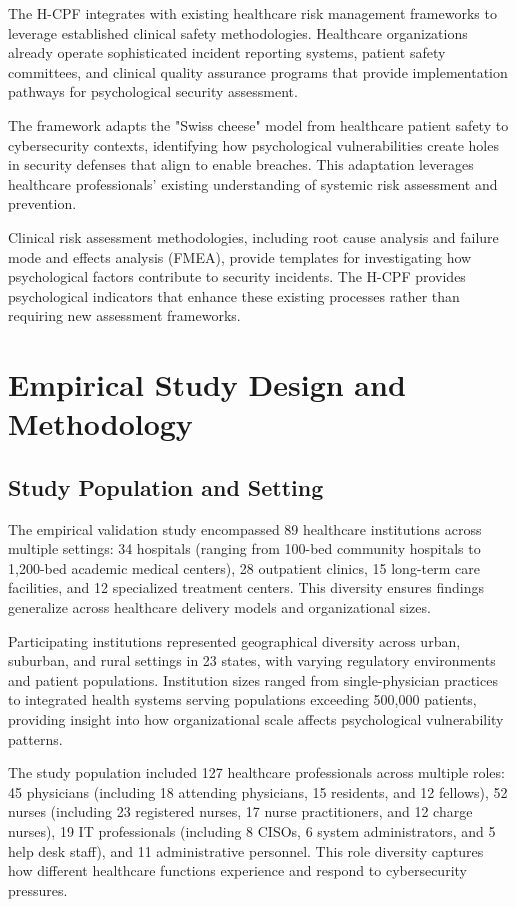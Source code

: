 \documentclass[10pt, twocolumn]{article}
\begin{document}
The H-CPF integrates with existing healthcare risk management frameworks to leverage established clinical safety methodologies. Healthcare organizations already operate sophisticated incident reporting systems, patient safety committees, and clinical quality assurance programs that provide implementation pathways for psychological security assessment.

The framework adapts the "Swiss cheese" model from healthcare patient safety\cite{reason2000} to cybersecurity contexts, identifying how psychological vulnerabilities create holes in security defenses that align to enable breaches. This adaptation leverages healthcare professionals' existing understanding of systemic risk assessment and prevention.

Clinical risk assessment methodologies, including root cause analysis and failure mode and effects analysis (FMEA), provide templates for investigating how psychological factors contribute to security incidents. The H-CPF provides psychological indicators that enhance these existing processes rather than requiring new assessment frameworks.

\section{Empirical Study Design and Methodology}

\subsection{Study Population and Setting}

The empirical validation study encompassed 89 healthcare institutions across multiple settings: 34 hospitals (ranging from 100-bed community hospitals to 1,200-bed academic medical centers), 28 outpatient clinics, 15 long-term care facilities, and 12 specialized treatment centers. This diversity ensures findings generalize across healthcare delivery models and organizational sizes.

Participating institutions represented geographical diversity across urban, suburban, and rural settings in 23 states, with varying regulatory environments and patient populations. Institution sizes ranged from single-physician practices to integrated health systems serving populations exceeding 500,000 patients, providing insight into how organizational scale affects psychological vulnerability patterns.

The study population included 127 healthcare professionals across multiple roles: 45 physicians (including 18 attending physicians, 15 residents, and 12 fellows), 52 nurses (including 23 registered nurses, 17 nurse practitioners, and 12 charge nurses), 19 IT professionals (including 8 CISOs, 6 system administrators, and 5 help desk staff), and 11 administrative personnel. This role diversity captures how different healthcare functions experience and respond to cybersecurity pressures.
\end{document}
